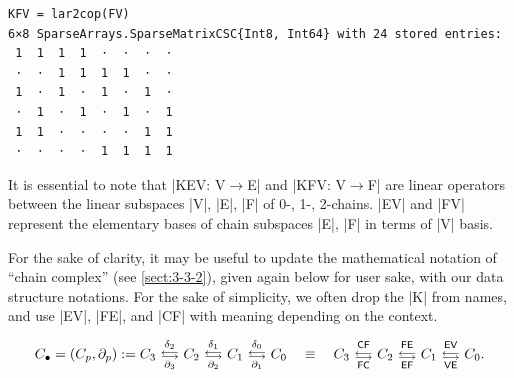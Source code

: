 \begin{lstlisting}[language=JuliaLocal, style=julia, mathescape=true]
KFV = lar2cop(FV)
6×8 SparseArrays.SparseMatrixCSC{Int8, Int64} with 24 stored entries:
 1  1  1  1  ⋅  ⋅  ⋅  ⋅
 ⋅  ⋅  1  1  1  1  ⋅  ⋅
 1  ⋅  1  ⋅  1  ⋅  1  ⋅
 ⋅  1  ⋅  1  ⋅  1  ⋅  1
 1  1  ⋅  ⋅  ⋅  ⋅  1  1
 ⋅  ⋅  ⋅  ⋅  1  1  1  1
\end{lstlisting}

\begin{remark}
It is essential to note that |KEV: V$\to$E| and |KFV: V$\to$F| are linear operators between the linear subspaces |V|, |E|, |F| of 0-, 1-, 2-chains. |EV| and |FV| represent the elementary bases of chain subspaces |E|, |F| in terms of |V| basis. 
\end{remark}

For the sake of clarity, it may be useful to update the mathematical notation of “chain complex” (see \ref{sect:3-3-2}), given again below for user sake, with our data structure notations. For the sake of simplicity, we often drop the |K| from names, and use |EV|, |FE|, and |CF| with meaning depending on the context.

\[ 
C_\bullet = (C_p, \partial_p) := 
C_3 \ 
\substack{
\delta_2 \\
\longleftarrow \\[-1mm]
\longrightarrow \\
\partial_3 
}
\ C_2 \ 
\substack{
\delta_1 \\
\longleftarrow \\[-1mm]
\longrightarrow \\
\partial_2 
}
\ C_1 \ 
\substack{
\delta_0 \\
\longleftarrow \\[-1mm]
\longrightarrow \\
\partial_1 
}
\ C_0 
\quad\equiv\quad
C_3 \ 
\substack{
\textsf{\scriptsize CF}\\
\longleftarrow \\[-1mm]
\longrightarrow \\
\textsf{\scriptsize FC}
}
\ C_2 \ 
\substack{
\textsf{\scriptsize FE}\\
\longleftarrow \\[-1mm]
\longrightarrow \\
\textsf{\scriptsize EF}
}
\ C_1 \ 
\substack{ 
\textsf{\scriptsize EV}\\
\longleftarrow \\[-1mm]
\longrightarrow \\
\textsf{\scriptsize VE}
}
\ C_0 .
\] 

